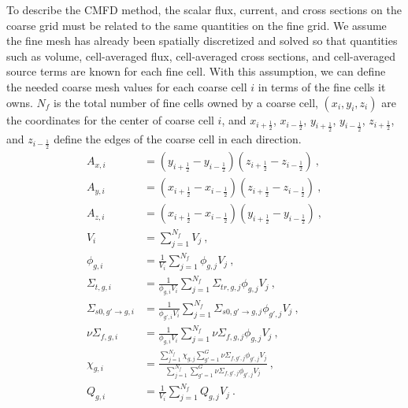 To describe the CMFD method, the scalar flux, current, and cross sections on the coarse grid must be related to the same quantities on the fine grid.  We assume the fine mesh has already been spatially discretized and solved so that quantities such as volume, cell-averaged flux, cell-averaged cross sections, and cell-averaged source terms are known for each fine cell.  With this assumption, we can define the needed coarse mesh values for each coarse cell $i$ in terms of the fine cells it owns.  $N_f$ is the total number of fine cells owned by a coarse cell, $\left(x_i,y_i,z_i\right)$ are the coordinates for the center of coarse cell $i$, and $x_{i+\frac{1}{2}}$, $x_{i-\frac{1}{2}}$, $y_{i+\frac{1}{2}}$, $y_{i-\frac{1}{2}}$, $z_{i+\frac{1}{2}}$, and $z_{i-\frac{1}{2}}$ define the edges of the coarse cell in each direction.
\begin{subequations}\label{e:CMFDhomogTerms}
\begin{align}
A_{x,i} &= \left(y_{i+\frac{1}{2}} - y_{i-\frac{1}{2}}\right)\left(z_{i+\frac{1}{2}} - z_{i-\frac{1}{2}}\right) \ ,\\
A_{y,i} &= \left(x_{i+\frac{1}{2}} - x_{i-\frac{1}{2}}\right)\left(z_{i+\frac{1}{2}} - z_{i-\frac{1}{2}}\right) \ ,\\
A_{z,i} &= \left(x_{i+\frac{1}{2}} - x_{i-\frac{1}{2}}\right)\left(y_{i+\frac{1}{2}} - y_{i-\frac{1}{2}}\right) \ ,\\
V_i &= \sum_{j=1}^{N_f} V_j \ ,\\
\phi_{g,i} &= \frac{1}{V_i}\sum_{j=1}^{N_f} \phi_{g,j} V_j \label{e:CMFDhomogFlux}\ ,\\
\Sigma_{t,g,i} &= \frac{1}{\phi_{g,i} V_i}\sum_{j=1}^{N_f} \Sigma_{tr,g,j} \phi_{g,j} V_j \ ,\\
\Sigma_{s0,g'\rightarrow g,i} &= \frac{1}{\phi_{g',i} V_i}\sum_{j=1}^{N_f} \Sigma_{s0,g'\rightarrow g,j} \phi_{g',j} V_j \ ,\\
\nu\Sigma_{f,g,i} &= \frac{1}{\phi_{g,i} V_i}\sum_{j=1}^{N_f} \nu\Sigma_{f,g,j} \phi_{g,j} V_j \ ,\\
\chi_{g,i} &= \frac{\sum_{j=1}^{N_f} \chi_{g,j} \sum_{g'=1}^G \nu\Sigma_{f,g',j} \phi_{g',j} V_j}{\sum_{j=1}^{N_f} \sum_{g'=1}^G \nu\Sigma_{f,g',j} \phi_{g',j} V_j} \ ,\\
Q_{g,i} &= \frac{1}{V_i}\sum_{j=1}^{N_f} Q_{g,j} V_j\ .
\end{align}
\end{subequations}

